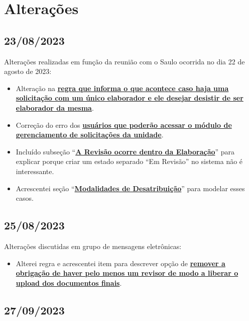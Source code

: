 \chapter*{Alterações}

\section*{23/08/2023}

Alterações realizadas em função da reunião com o Saulo ocorrida no dia 22 de agosto de 2023:

\begin{itemize}
	\item Alteração na \hyperlink{data230823mudanca1}{\textbf{regra que informa o que acontece caso haja uma solicitação com um único elaborador e ele desejar desistir de ser elaborador da mesma}}. 

	\item Correção do erro dos \hyperlink{data230823mudanca2}{\textbf{usuários que poderão acessar o módulo de gerenciamento de solicitações da unidade}}. 
	
	\item Incluído subseção ``\hyperlink{data230823mudanca3}{\textbf{A Revisão ocorre dentro da Elaboração}}'' para explicar porque criar um estado separado ``Em Revisão'' no sistema não é interessante.
	
	\item Acrescentei seção ``\hyperlink{data230823mudanca4}{\textbf{Modalidades de Desatribuição}}'' para modelar esses casos.
\end{itemize}


\section*{25/08/2023}

Alterações discutidas em grupo de mensagens eletrônicas:

\begin{itemize}
	\item Alterei regra e acrescentei item para descrever opção de \hyperlink{data250823mudanca1}{\textbf{remover a obrigação de haver pelo menos um revisor de modo a liberar o upload dos documentos finais}}.
\end{itemize}

\section*{27/09/2023}

